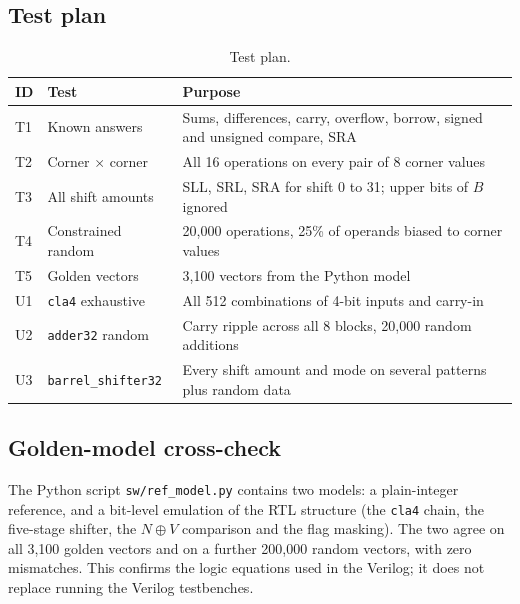 \documentclass[11pt,a4paper]{article}
\begin{document}
\subsection{Test plan}
\begin{table}[H]\centering\small
\begin{tabular}{@{}llp{8.2cm}@{}}\toprule
ID & Test & Purpose\\\midrule
T1 & Known answers & Sums, differences, carry, overflow, borrow, signed and unsigned compare, SRA\\
T2 & Corner $\times$ corner & All 16 operations on every pair of 8 corner values\\
T3 & All shift amounts & SLL, SRL, SRA for shift 0 to 31; upper bits of $B$ ignored\\
T4 & Constrained random & 20,000 operations, 25\% of operands biased to corner values\\
T5 & Golden vectors & 3,100 vectors from the Python model\\
U1 & \texttt{cla4} exhaustive & All 512 combinations of 4-bit inputs and carry-in\\
U2 & \texttt{adder32} random & Carry ripple across all 8 blocks, 20,000 random additions\\
U3 & \texttt{barrel\_shifter32} & Every shift amount and mode on several patterns plus random data\\\bottomrule
\end{tabular}
\caption{Test plan.}
\end{table}

\subsection{Golden-model cross-check}
The Python script \texttt{sw/ref\_model.py} contains two models: a plain-integer reference, and a bit-level emulation of the RTL structure (the \texttt{cla4} chain, the five-stage shifter, the $N\oplus V$ comparison and the flag masking). The two agree on all 3,100 golden vectors and on a further 200,000 random vectors, with zero mismatches. This confirms the logic equations used in the Verilog; it does not replace running the Verilog testbenches.
\end{document}
